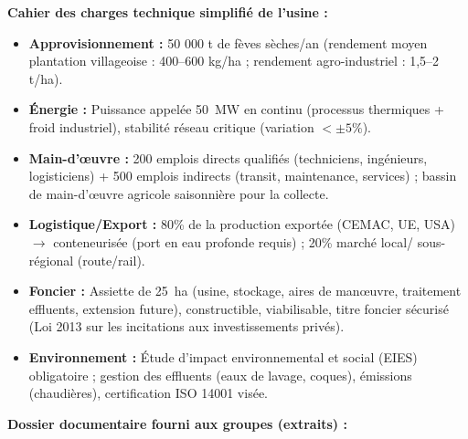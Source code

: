 \documentclass[11pt]{article}
\newcommand{\cle}[1]{{\popxbold\color{popdark}#1}}
\begin{document}
\textbf{Cahier des charges technique simplifié de l'usine :}
\begin{itemize}
    \item \textbf{Approvisionnement :} 50 000 t de fèves sèches/an (rendement moyen plantation villageoise : 400--600 kg/ha ; rendement agro-industriel : 1,5--2 t/ha).
    \item \textbf{Énergie :} Puissance appelée \SI{50}{MW} en continu (processus thermiques + froid industriel), stabilité réseau critique (variation $< \pm 5\%$).
    \item \textbf{Main-d'œuvre :} 200 emplois directs qualifiés (techniciens, ingénieurs, logisticiens) + 500 emplois indirects (transit, maintenance, services) ; bassin de main-d'œuvre agricole saisonnière pour la collecte.
    \item \textbf{Logistique/Export :} 80\% de la production exportée (CEMAC, UE, USA) $\rightarrow$ conteneurisée (port en eau profonde requis) ; 20\% marché local/ sous-régional (route/rail).
    \item \textbf{Foncier :} Assiette de \SI{25}{ha} (usine, stockage, aires de manœuvre, traitement effluents, extension future), constructible, viabilisable, titre foncier sécurisé (Loi 2013 sur les incitations aux investissements privés).
    \item \textbf{Environnement :} Étude d'impact environnemental et social (EIES) obligatoire ; gestion des effluents (eaux de lavage, coques), émissions (chaudières), certification \cle{ISO 14001} visée.
\end{itemize}

\textbf{Dossier documentaire fourni aux groupes (extraits) :}
\end{document}
